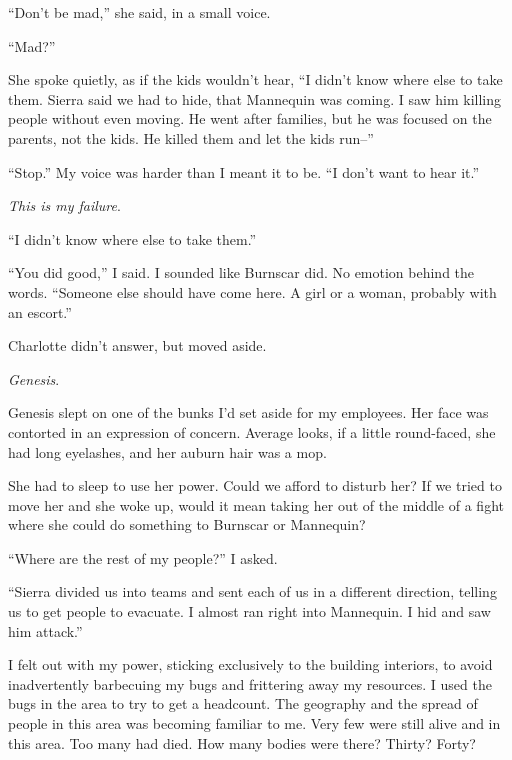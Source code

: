 ``Don't be mad,'' she said, in a small voice.



``Mad?''



She spoke quietly, as if the kids wouldn't hear, ``I didn't know where else to take them.  Sierra said we had to hide, that Mannequin was coming.  I saw him killing people without even moving.  He went after families, but he was focused on the parents, not the kids.  He killed them and let the kids run--''



``Stop.''  My voice was harder than I meant it to be.  ``I don't want to hear it.''



\emph{This is my failure}.



``I didn't know where else to take them.''



``You did good,'' I said.  I sounded like Burnscar did.  No emotion behind the words.  ``Someone else should have come here.  A girl or a woman, probably with an escort.''



Charlotte didn't answer, but moved aside.



\emph{Genesis}.



Genesis slept on one of the bunks I'd set aside for my employees.  Her face was contorted in an expression of concern.  Average looks, if a little round-faced, she had long eyelashes, and her auburn hair was a mop.



She had to sleep to use her power.  Could we afford to disturb her?  If we tried to move her and she woke up, would it mean taking her out of the middle of a fight where she could do something to Burnscar or Mannequin?



``Where are the rest of my people?'' I asked.



``Sierra divided us into teams and sent each of us in a different direction, telling us to get people to evacuate.  I almost ran right into Mannequin.  I hid and saw him attack.''



I felt out with my power, sticking exclusively to the building interiors, to avoid inadvertently barbecuing my bugs and frittering away my resources.  I used the bugs in the area to try to get a headcount.  The geography and the spread of people in this area was becoming familiar to me.  Very few were still alive and in this area.  Too many had died.  How many bodies were there?  Thirty?  Forty?



